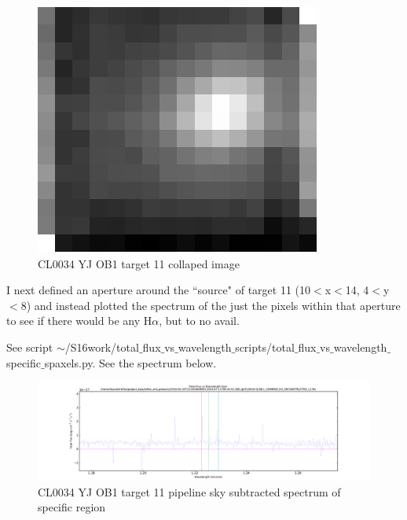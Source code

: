 \documentclass[10pt,letterpaper]{article}
\begin{document}
\begin{figure}[h!]
\caption{CL0034 YJ OB1 target 11 collaped image}\label{fig:CL0034 YJ OB1 target 11 collapsed image}
\begin{center}
\includegraphics[scale=0.4]{figures/CL0034_target_11_OB1_collapsed.png}
\end{center}
\end{figure}

I next defined an aperture around the ``source" of target 11 (10$<$x$<$14, 4$<$y$<$8) and instead plotted the spectrum of the just the pixels within that aperture to see if there would be any H$\alpha$, but to no avail. 

See script $\sim$/S16work/total$\_$flux$\_$vs$\_$wavelength$\_$scripts/total$\_$flux$\_$vs$\_$wavelength$\_$specific$\_$spaxels.py. See the spectrum below. \\

\begin{figure}[h!]
\caption{CL0034 YJ OB1 target 11 pipeline sky subtracted spectrum of specific region}\label{fig:CL0034 YJ OB1 target 11 pipeline sky subtracted spectrum of specific region}
\includegraphics[scale=0.4]{figures/CL0034-YJ-OB-1_COMBINE_SCI_RECONSTRUCTED_11_specific_spaxels.pdf}
\end{figure}
\end{document}

